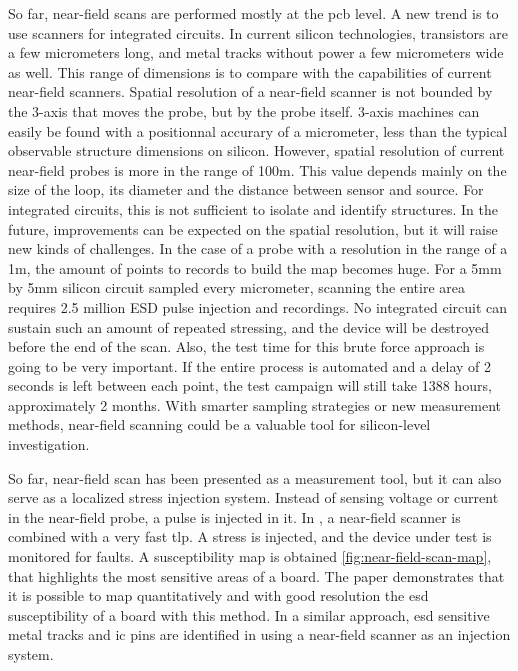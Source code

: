 So far, near-field scans are performed mostly at the \gls{pcb} level.
A new trend is to use scanners for integrated circuits.
In current silicon technologies, transistors are a few micrometers long, and metal tracks without power a few micrometers wide as well.
This range of dimensions is to compare with the capabilities of current near-field scanners.
Spatial resolution of a near-field scanner is not bounded by the 3-axis that moves the probe, but by the probe itself.
3-axis machines can easily be found with a positionnal accurary of a micrometer, less than the typical observable structure dimensions on silicon.
However, spatial resolution of current near-field probes is more in the range of 100\textmu{}m.
This value depends mainly on the size of the loop, its diameter and the distance between sensor and source.
For integrated circuits, this is not sufficient to isolate and identify structures.
In the future, improvements can be expected on the spatial resolution, but it will raise new kinds of challenges.
In the case of a probe with a resolution in the range of a 1\textmu{}m, the amount of points to records to build the map becomes huge.
For a 5mm by 5mm silicon circuit sampled every micrometer, scanning the entire area requires 2.5 million ESD pulse injection and recordings.
No integrated circuit can sustain such an amount of repeated stressing, and the device will be destroyed before the end of the scan.
Also, the test time for this brute force approach is going to be very important.
If the entire process is automated and a delay of 2 seconds is left between each point, the test campaign will still take 1388 hours, approximately 2 months.
With smarter sampling strategies or new measurement methods, near-field scanning could be a valuable tool for silicon-level investigation.

So far, near-field scan has been presented as a measurement tool, but it can also serve as a localized stress injection system.
Instead of sensing voltage or current in the near-field probe, a pulse is injected in it.
In \cite{NearFieldInjectionFabrice}, a near-field scanner is combined with a very fast \gls{tlp}.
A stress is injected, and the device under test is monitored for faults.
A susceptibility map is obtained \ref{fig:near-field-scan-map}, that highlights the most sensitive areas of a board.
The paper demonstrates that it is possible to map quantitatively and with good resolution the \gls{esd} susceptibility of a board with this method.
In a similar approach, \gls{esd} sensitive metal tracks and \gls{ic} pins are identified in \cite{NearFieldInjectionBis} using a near-field scanner as an injection system.

